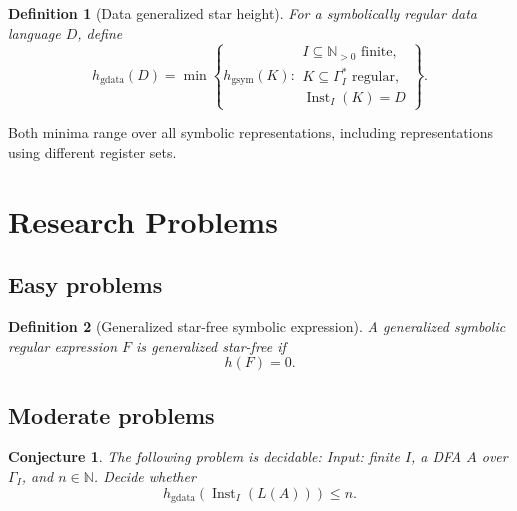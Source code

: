 \documentclass[11pt]{article}
\newtheorem{definition}{Definition}
\newtheorem{conjecture}{Conjecture}
\begin{document}
\begin{definition}[Data generalized star height]
For a symbolically regular data language $D$, define
\[
 h_{\mathrm{gdata}}(D)=
 \min\left\{
 h_{\mathrm{gsym}}(K):
 \begin{array}{l}
 I\subseteq\mathbb N_{>0}\text{ finite},\\
 K\subseteq\Gamma_I^*\text{ regular},\\
 \operatorname{Inst}_I(K)=D
 \end{array}
 \right\}.
\]
\end{definition}

Both minima range over all symbolic representations, including
representations using different register sets.

\section{Research Problems }

\subsection{Easy problems}






\begin{definition}[Generalized star-free symbolic expression]
A generalized symbolic regular expression $F$ is
\emph{generalized star-free} if
\[
  h(F)=0.
\]
\end{definition}







\subsection{Moderate problems}



\begin{conjecture}
The following problem is decidable: 
Input: finite $I$, a DFA $A$ over $\Gamma_I$, and $n\in\mathbb N$.
Decide whether
\[
 h_{\mathrm{gdata}}(\operatorname{Inst}_I(L(A)))\leq n.
\]
\end{conjecture}
\end{document}
